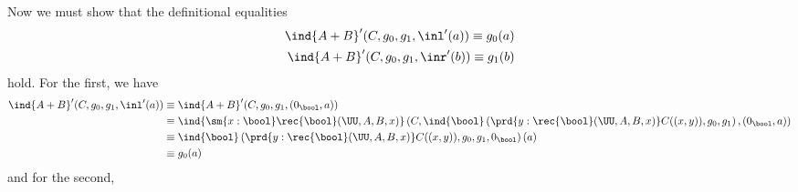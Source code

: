     Now we must show that the definitional equalities
    \begin{align*}
    \ind{A+B}'(C, g_{0}, g_{1}, \inl'(a)) \equiv g_{0}(a) \\
    \ind{A+B}'(C, g_{0}, g_{1}, \inr'(b)) \equiv g_{1}(b)
    \end{align*}
    hold.  For the first, we have
    \begin{align*}
    \ind{A+B}'(C, g_{0}, g_{1}, \inl'(a)) 
    &\equiv
    \ind{A+B}'(C, g_{0}, g_{1}, (0_{\bool}, a)) 
    \\&\equiv
    \ind{\sm{x:\bool}\rec{\bool}(\UU, A, B, x)}\left(
    C,
    \ind{\bool}\left(
    \prd{y:\rec{\bool}(\UU, A, B, x)} C((x, y)),
    g_{0},
    g_{1}
    \right),
    (0_{\bool}, a)
    \right)
    \\&\equiv
    \ind{\bool}\left(
    \prd{y:\rec{\bool}(\UU, A, B, x)} C((x, y)),
    g_{0},
    g_{1},
    0_{\bool}
    \right)(a)
    \\&\equiv
    g_{0}(a)
    \end{align*}
    and for the second,

